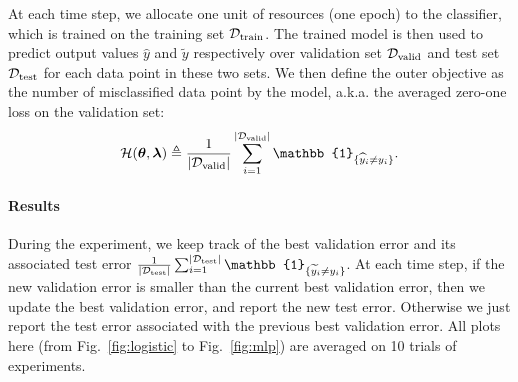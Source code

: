 \documentclass[twoside,11pt]{article}
\begin{document}
At each time step, we allocate one unit of resources (one epoch) to the classifier, which is trained on the training set $\mathcal{D}_{\operatorname{train}}$. The trained model is then used to predict output values $\hat{y}$ and $\tilde{y}$ respectively over validation set $\mathcal{D}_{\operatorname{valid}}$ and test set $\mathcal{D}_{\operatorname{test}}$ for each data point in these two sets. We then define the outer objective as the number of misclassified data point by the model, a.k.a. the averaged zero-one loss on the validation set:
\[
\cH(\btheta,\blambda) \eqdef \frac{1}{|\cD_{\operatorname{valid}}|} \sum_{i=1}^{|\cD_{\operatorname{valid}}|} \mathbb{1}_{\{\hat{y}_i \neq y_i\}}.
\]

\paragraph{Results}

During the experiment, we keep track of the best validation error and its associated test error $\frac{1}{|\cD_{\operatorname{test}}|} \sum_{i=1}^{|\cD_{\operatorname{test}}|} \mathbb{1}_{\{\tilde{y}_i \neq y_i\}}$. At each time step, if the new validation error is smaller than the current best validation error, then we update the best validation error, and report the new test error. Otherwise we just report the test error associated with the previous best validation error. All plots here (from Fig.~\ref{fig:logistic} to Fig.~\ref{fig:mlp}) are averaged on 10 trials of experiments.
\end{document}
